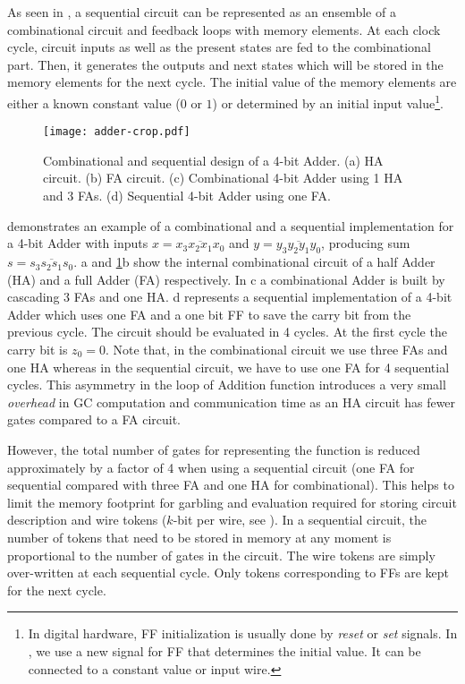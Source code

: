 As seen in , a sequential circuit can be represented as an ensemble of a combinational circuit and feedback loops with memory elements.
At each clock cycle, circuit inputs as well as the present states are fed to the combinational part.
Then, it generates the outputs and next states which will be stored in the memory elements for the next cycle.
The initial value of the memory elements are either a known constant value ($0$ or $1$) or determined by an initial input value\footnote{In digital hardware, FF initialization is usually done by \emph{reset} or \emph{set} signals.
In \sys{}, we use a new signal for FF that determines the initial value.
It can be connected to a constant value or input wire.}.

\begin{figure}[h!]
    \centering
    \texttt{[image: adder-crop.pdf]}
    \caption{Combinational and sequential design of a 4-bit Adder.
  (a) HA circuit.
  (b) FA circuit.
  (c) Combinational 4-bit Adder using 1 HA and 3 FAs.
  (d) Sequential 4-bit Adder using one FA.}\label{fig:combSeq}
\end{figure}

 demonstrates an example of a combinational and a sequential implementation for a 4-bit Adder with inputs $x = \overline{x_3x_2x_1x_0}$ and $y = \overline{y_3y_2y_1y_0}$, producing sum $s = \overline{s_3s_2s_1s_0}$.
a and \ref{fig:combSeq}b show the internal combinational circuit of a half Adder (HA) and a full Adder (FA) respectively.
In c a combinational Adder is built by cascading 3 FAs and one HA.
d represents a sequential implementation of a 4-bit Adder which uses one FA and a one bit FF to save the carry bit from the previous cycle.
The circuit should be evaluated in 4 cycles.
At the first cycle the carry bit is $z_0=0$.
Note that, in the combinational circuit we use three FAs and one HA whereas in the sequential circuit, we have to use one FA for 4 sequential cycles.
This asymmetry in the loop of Addition function introduces a very small \emph{overhead} in GC computation and communication time as an HA circuit has fewer gates compared to a FA circuit.

However, the total number of gates for representing the function is reduced approximately by a factor of 4 when using a sequential circuit (one FA for sequential compared with three FA and one HA for combinational).
This helps to limit the memory footprint for garbling and evaluation required for storing circuit description and wire tokens ($k$-bit per wire, see ).
In a sequential circuit, the number of tokens that need to be stored in memory at any moment is proportional to the number of gates in the circuit.
The wire tokens are simply over-written at each sequential cycle.
Only tokens corresponding to FFs are kept for the next cycle.


